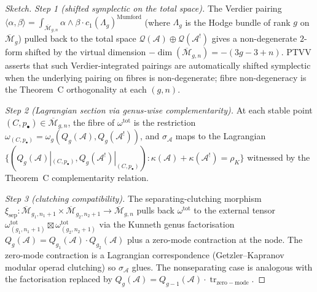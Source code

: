 \documentclass[11pt]{article}
\begin{document}
\begin{proof}[Sketch]
\textit{Step 1 (shifted symplectic on the total space).} The
Verdier pairing
$\langle \alpha, \beta \rangle = \int_{\overline{\mathcal{M}}_{g,n}}
  \alpha \wedge \beta \cdot c_1(\Lambda_g)^{\mathrm{Mumford}}$
(where $\Lambda_g$ is the Hodge bundle of rank $g$ on
$\overline{\mathcal{M}}_g$) pulled back to the total space
$\mathcal{Q}(\mathcal{A}) \oplus \mathcal{Q}(\mathcal{A}^!)$ gives
a non-degenerate $2$-form shifted by the virtual dimension
$-\dim(\overline{\mathcal{M}}_{g,n}) = -(3g{-}3{+}n)$. PTVV
\cite[Thm~2.5]{PTVV13} asserts that such Verdier-integrated
pairings are automatically shifted symplectic when the underlying
pairing on fibres is non-degenerate; fibre non-degeneracy is the
Theorem~C orthogonality at each $(g, n)$.

\textit{Step 2 (Lagrangian section via genus-wise complementarity).}
At each stable point $(C, p_\bullet) \in
\overline{\mathcal{M}}_{g,n}$, the fibre of
$\omega^{\mathrm{tot}}$ is the restriction
$\omega_{(C,p_\bullet)} = \omega_g(Q_g(\mathcal{A}),
Q_g(\mathcal{A}^!))$, and $\sigma_{\mathcal{A}}$ maps to the
Lagrangian
$\{(Q_g(\mathcal{A})|_{(C,p_\bullet)},
   Q_g(\mathcal{A}^!)|_{(C,p_\bullet)})
 : \kappa(\mathcal{A}) + \kappa(\mathcal{A}^!) = \rho_K\}$
witnessed by the Theorem~C complementarity relation.

\textit{Step 3 (clutching compatibility).} The separating-clutching
morphism $\xi_{\mathrm{sep}}\colon
\overline{\mathcal{M}}_{g_1,n_1+1} \times
\overline{\mathcal{M}}_{g_2,n_2+1} \to
\overline{\mathcal{M}}_{g,n}$ pulls back $\omega^{\mathrm{tot}}$ to
the external tensor $\omega^{\mathrm{tot}}_{(g_1,n_1+1)} \boxtimes
\omega^{\mathrm{tot}}_{(g_2,n_2+1)}$ via the Kunneth genus
factorisation
$Q_g(\mathcal{A}) = Q_{g_1}(\mathcal{A}) \cdot
Q_{g_2}(\mathcal{A})$ plus a zero-mode contraction at the node.
The zero-mode contraction is a Lagrangian correspondence (Getzler--Kapranov
modular operad clutching) so $\sigma_{\mathcal{A}}$ glues. The
nonseparating case is analogous with the factorisation replaced by
$Q_g(\mathcal{A}) = Q_{g-1}(\mathcal{A}) \cdot
\operatorname{tr}_{\mathrm{zero-mode}}$.
\end{proof}
\end{document}
